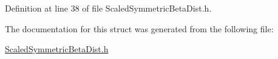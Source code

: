 Definition at line 38 of file Scaled\+Symmetric\+Beta\+Dist.\+h.



The documentation for this struct was generated from the following file\+:\begin{DoxyCompactItemize}
\item 
\hyperlink{ScaledSymmetricBetaDist_8h}{Scaled\+Symmetric\+Beta\+Dist.\+h}\end{DoxyCompactItemize}
